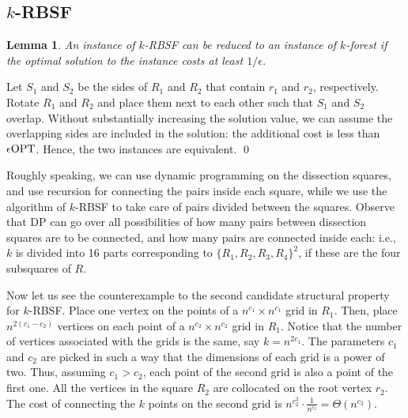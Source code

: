 \documentclass[extras,11pt]{article} \usepackage{fullpage}
\theoremstyle{mytheorem}
\newtheorem{lemma}[theorem]{Lemma}
\renewenvironment{proof}{\par\noindent{\bf Proof.}\hspace{0.5em}}
    {\hfill\qed\vspace{1ex}}
\newcommand{\eps}{\epsilon}
\newcommand{\OPT}{\mbox{\rm OPT}}
\begin{document}
\iffalse

\subsection{$k$-RBSF}\label{sec:krbsf}






\begin{lemma}\label{lem:krbsf->kfor}
An instance of $k$-RBSF can be reduced to an instance of $k$-forest
if the optimal solution to the instance costs at least $1/\eps$.
\end{lemma}
\begin{proof}
Let $S_1$ and $S_2$ be the sides of $R_1$ and $R_2$ that contain $r_1$ and $r_2$, respectively.
Rotate $R_1$ and $R_2$ and place them next to each other such that $S_1$ and $S_2$ overlap.
Without substantially increasing the solution value,
we can assume the overlapping sides are included in the  solution:
the additional cost  is less than $\eps\OPT$.
Hence, the two instances are equivalent.
\end{proof}

Roughly speaking, we can use dynamic programming on the dissection squares,
and use recursion for connecting the pairs inside each square,
while we use the algorithm of $k$-RBSF to take care of pairs
divided between the squares.
Observe that DP can go over all possibilities of how many pairs between
dissection squares are to be connected, and how many pairs are connected
inside each: i.e., $k$ is divided into 16 parts corresponding to $\{R_1,R_2,R_3,R_4\}^2$,
if these are the four subsquares of $R$.


Now let us see the counterexample to the second candidate structural property for $k$-RBSF.
Place one vertex on the points of a $n^{c_1}\times n^{c_1}$ grid in $R_1$.
Then, place $n^{2(c_1-c_2)}$ vertices on each point of a $n^{c_2}\times n^{c_2}$ grid in $R_1$.
Notice that the number of vertices associated with the grids is the same, say $k=n^{2c_1}$.
The parameters $c_1$ and $c_2$ are picked in such a way that the dimensions of each grid is a power of two.
Thus, assuming $c_1 > c_2$, each point of the second grid is also a point of the first one.
All the vertices in the square $R_2$ are collocated on the root vertex $r_2$.
The cost of connecting the $k$ points on the second grid is $n^{c_2^2}\cdot \frac{1}{n^{c_2}}=\Theta(n^{c_2})$.
\end{document}
